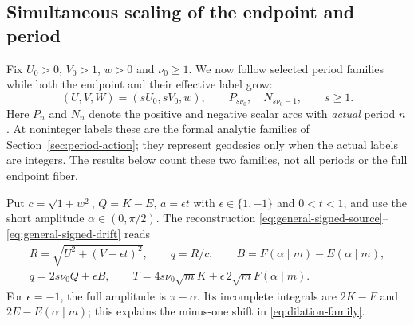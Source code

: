 \documentclass[11pt,a4paper]{article}
\theoremstyle{remark}\newtheorem{remark}[theorem]{Remark}
\begin{document}
\subsection{Simultaneous scaling of the endpoint and period}
\label{sec:dilation}

Fix $U_0>0$, $V_0>1$, $w>0$ and $\nu_0\ge1$. We now follow selected
period families while both the endpoint and their effective label grow:
\begin{equation}\label{eq:dilation-family}
 (U,V,W)=(sU_0,sV_0,w),\qquad
 P_{s\nu_0},\quad N_{s\nu_0-1},\qquad s\ge1.
\end{equation}
Here $P_n$ and $N_n$ denote the positive and negative scalar arcs with
\emph{actual} period $n$. At noninteger labels these are the formal
analytic families of Section~\ref{sec:period-action}; they represent
geodesics only when the actual labels are integers. The results below
count these two families, not all periods or the full endpoint fiber.

Put $c=\sqrt{1+w^2}$, $Q=K-E$, $a=\epsilon t$ with
$\epsilon\in\{1,-1\}$ and $0<t<1$, and use the short amplitude
$\alpha\in(0,\pi/2)$. The reconstruction
\eqref{eq:general-signed-source}--\eqref{eq:general-signed-drift} reads
\begin{equation}\label{eq:dilation-source-clock}
 \begin{gathered}
 R=\sqrt{U^2+(V-\epsilon t)^2},\qquad q=R/c,
 \qquad B=F(\alpha\mid m)-E(\alpha\mid m),\\
 q=2s\nu_0Q+\epsilon B,\qquad
 T=4s\nu_0\sqrt m K+\epsilon\,2\sqrt m F(\alpha\mid m).
 \end{gathered}
\end{equation}
For $\epsilon=-1$, the full amplitude is $\pi-\alpha$. Its incomplete
integrals are $2K-F$ and $2E-E(\alpha\mid m)$; this explains the
minus-one shift in \eqref{eq:dilation-family}.
\end{document}
